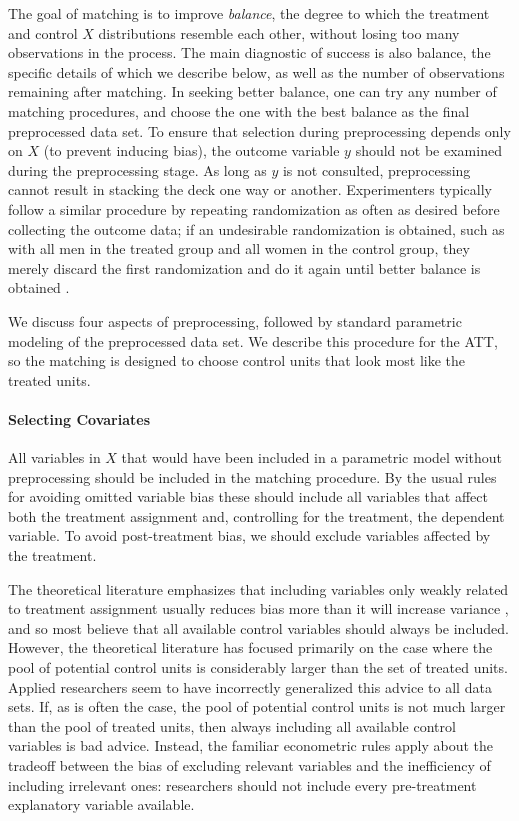 \documentclass[11pt,titlepage]{article}
\begin{document}
The goal of matching is to improve \emph{balance}, the degree to which
the treatment and control $X$ distributions resemble each other,
without losing too many observations in the process.  The main
diagnostic of success is also balance, the specific details of which
we describe below, as well as the number of observations remaining
after matching.  In seeking better balance, one can try any number of
matching procedures, and choose the one with the best balance as the
final preprocessed data set.  To ensure that selection during
preprocessing depends only on $X$ (to prevent inducing bias), the
outcome variable $y$ should not be examined during the preprocessing
stage.  As long as $y$ is not consulted, preprocessing cannot result
in stacking the deck one way or another.  Experimenters typically
follow a similar procedure by repeating randomization as often as
desired before collecting the outcome data; if an undesirable
randomization is obtained, such as with all men in the treated group
and all women in the control group, they merely discard the first
randomization and do it again until better balance is obtained
\citep[see][]{Rubin01}.

We discuss four aspects of preprocessing, followed by standard
parametric modeling of the preprocessed data set.  We describe this
procedure for the ATT, so the matching is designed to choose control
units that look most like the treated units.

\paragraph{Selecting Covariates}
All variables in $X$ that would have been included in a parametric
model without preprocessing should be included in the matching
procedure.  By the usual rules for avoiding omitted variable bias
these should include all variables that affect both the treatment
assignment and, controlling for the treatment, the dependent variable.
To avoid post-treatment bias, we should exclude variables affected by
the treatment.  

The theoretical literature emphasizes that including variables only
weakly related to treatment assignment usually reduces bias more than
it will increase variance \citep{RubTho96, HecIchSmi98}, and so most
believe that all available control variables should always be
included.  However, the theoretical literature has focused primarily
on the case where the pool of potential control units is considerably
larger than the set of treated units.  Applied researchers seem to
have incorrectly generalized this advice to all data sets.  If, as is
often the case, the pool of potential control units is not much larger
than the pool of treated units, then always including all available
control variables is bad advice.  Instead, the familiar econometric
rules apply about the tradeoff between the bias of excluding relevant
variables and the inefficiency of including irrelevant ones:
researchers should not include every pre-treatment explanatory
variable available.
\end{document}
